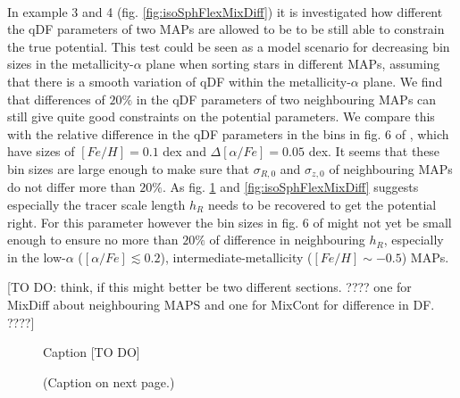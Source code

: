 \\In example 3 and 4 (fig. \ref{fig:isoSphFlexMixDiff}) it is investigated how different the qDF parameters of two MAPs are allowed to be to be still able to constrain the true potential. This test could be seen as a model scenario for decreasing bin sizes in the metallicity-$\alpha$ plane when sorting stars in different MAPs, assuming that there is a smooth variation of qDF within the metallicity-$\alpha$ plane. We find that differences of $20\%$ in the qDF parameters of two neighbouring MAPs can still give quite good constraints on the potential parameters. We compare this with the relative difference in the qDF parameters in the bins in fig. 6 of \cite{bov13}, which have sizes of $[Fe/H] = 0.1$ dex and $\Delta [\alpha/Fe] = 0.05$ dex. It seems that these bin sizes are large enough to make sure that $\sigma_{R,0}$ and $\sigma_{z,0}$ of neighbouring MAPs do not differ more than $20\%$. As fig. \ref{fig:isoSphFlexMixCont} and \ref{fig:isoSphFlexMixDiff} suggests especially the tracer scale length $h_R$ needs to be recovered to get the potential right. For this parameter however the bin sizes in fig. 6 of \cite{bov13} might not yet be small enough to ensure no more than $20\%$ of difference in neighbouring $h_R$, especially in the low-$\alpha$ ($[\alpha/Fe] \lesssim 0.2$), intermediate-metallicity ($[Fe/H] \sim -0.5$) MAPs.

[TO DO: think, if this might better be two different sections. ???? one for MixDiff about neighbouring MAPS and one for MixCont for difference in DF. ????]



\begin{figure}
\caption{Caption [TO DO]}
\end{figure}

\begin{figure}
\caption{(Caption on next page.)}
\label{fig:isoSphFlexMixCont}
\end{figure}


